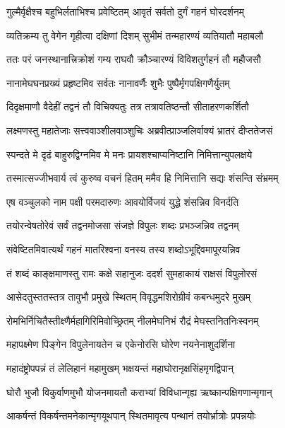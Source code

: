 \twolineshloka
{गुल्मैर्वृक्षैश्च बहुभिर्लताभिश्च प्रवेष्टितम्}
{आवृतं सर्वतो दुर्गं गहनं घोरदर्शनम्} %

\twolineshloka
{व्यतिक्रम्य तु वेगेन गृहीत्वा दक्षिणां दिशम्}
{सुभीमं तन्महारण्यं व्यतियातौ महाबलौ} %

\twolineshloka
{ततः परं जनस्थानात्त्रिक्रोशं गम्य राघवौ}
{क्रौञ्चारण्यं विविशतुर्गहनं तौ महौजसौ} %

\twolineshloka
{नानामेघघनप्रख्यं प्रहृष्टमिव सर्वतः}
{नानावर्णैः शुभैः पुष्पैर्मृगपक्षिगणैर्युतम्} %

\twolineshloka
{दिदृक्षमाणौ वैदेहीं तद्वनं तौ विचिक्यतुः}
{तत्र तत्रावतिष्ठन्तौ सीताहरणकर्शितौ} %

\twolineshloka
{लक्ष्मणस्तु महातेजाः सत्त्ववाञ्शीलवाञ्शुचिः}
{अब्रवीत्प्राञ्जलिर्वाक्यं भ्रातरं दीप्ततेजसं} %

\twolineshloka
{स्पन्दते मे दृढं बाहुरुद्विग्नमिव मे मनः}
{प्रायशश्चाप्यनिष्टानि निमित्तान्युपलक्षये} %

\twolineshloka
{तस्मात्सज्जीभवार्य त्वं कुरुष्व वचनं हितम्}
{ममैव हि निमित्तानि सद्यः शंसन्ति संभ्रमम्} %

\twolineshloka
{एष वञ्चुलको नाम पक्षी परमदारुणः}
{आवयोर्विजयं युद्धे शंसन्निव विनर्दति} %

\twolineshloka
{तयोरन्वेषतोरेवं सर्वं तद्वनमोजसा}
{संजज्ञे विपुलः शब्दः प्रभञ्जन्निव तद्वनम्} %

\twolineshloka
{संवेष्टितमिवात्यर्थं गहनं मातरिश्वना}
{वनस्य तस्य शब्दोऽभूद्दिवमापूरयन्निव} %

\twolineshloka
{तं शब्दं काङ्क्षमाणस्तु रामः कक्षे सहानुजः}
{ददर्श सुमहाकायं राक्षसं विपुलोरसं} %

\twolineshloka
{आसेदतुस्ततस्तत्र तावुभौ प्रमुखे स्थितम्}
{विवृद्धमशिरोग्रीवं कबन्धमुदरे मुखम्} %

\twolineshloka
{रोमभिर्निचितैस्तीक्ष्णैर्महागिरिमिवोच्छ्रितम्}
{नीलमेघनिभं रौद्रं मेघस्तनितनिःस्वनम्} %

\twolineshloka
{महापक्ष्मेण पिङ्गेन विपुलेनायतेन च}
{एकेनोरसि घोरेण नयनेनाशुदर्शिना} %

\twolineshloka
{महादंष्ट्रोपपन्नं तं लेलिहानं महामुखम्}
{भक्षयन्तं महाघोरानृक्षसिंहमृगद्विपान्} %

\twolineshloka
{घोरौ भुजौ विकुर्वाणमुभौ योजनमायतौ}
{कराभ्यां विविधान्गृह्य ऋष्कान्पक्षिगणान्मृगान्} %

\twolineshloka
{आकर्षन्तं विकर्षन्तमनेकान्मृगयूथपान्}
{स्थितमावृत्य पन्थानं तयोर्भ्रात्रोः प्रपन्नयोः} %

